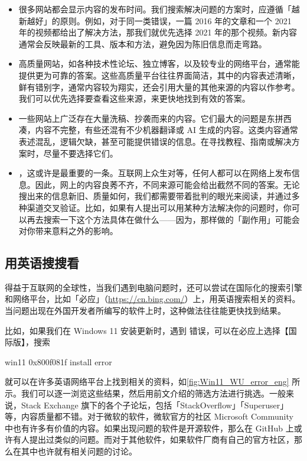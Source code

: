 \begin{itemize}
  \item {}很多网站都会显示内容的发布时间。我们搜索解决问题的方案时，应遵循「越新越好」的原则。例如，对于同一类错误，一篇 2016 年的文章和一个 2021 年的视频都给出了解决方法，那我们就优先选择 2021 年的那个视频。新内容通常会反映最新的工具、版本和方法，避免因为陈旧信息而走弯路。
  \item {}高质量网站，如各种技术性论坛、独立博客，以及较专业的网络平台，通常能提供更为可靠的答案。这些高质量平台往往界面简洁，其中的内容表述清晰，鲜有错别字，通常内容较为翔实，还会引用大量的其他来源的内容以作参考。我们可以优先选择要查看这些来源，来更快地找到有效的答案。
  \item {}一些网站上广泛存在大量洗稿、抄袭而来的内容。它们最大的问题是东拼西凑，内容不完整，有些还混有不少机器翻译或 AI 生成的内容。这类内容通常表述混乱，逻辑欠缺，甚至可能提供错误的信息。在寻找教程、指南或解决方案时，尽量不要选择它们。
  \item {}，这或许是最重要的一条。互联网上众生对等，任何人都可以在网络上发布信息。因此，网上的内容良莠不齐，不同来源可能会给出截然不同的答案。无论搜出来的信息新旧、质量如何，我们都需要带着批判的眼光来阅读，并通过多种渠道交叉验证。比如，如果有人提出可以用某种方法解决你的问题时，你可以再去搜索一下这个方法具体在做什么——因为，那样做的「副作用」可能会对你带来意料之外的影响。
\end{itemize}

\subsection{用英语搜搜看}

得益于互联网的全球性，当我们遇到电脑问题时，还可以尝试在国际化的搜索引擎和网络平台，比如「必应」（\url{https://cn.bing.com/}）上，用英语搜索相关的资料。当问题出现在外国开发者所编写的软件上时，这种做法往往能更快找到结果。

比如，如果我们在 Windows 11 安装更新时，遇到  错误，可以在必应上选择【国际版】，搜索

\begin{quoting}
  win11 0x800f081f install error
\end{quoting}

就可以在许多英语网络平台上找到相关的资料，如\autoref{fig:Win11_WU_error_eng} 所示。我们可以逐一浏览这些结果，然后用前文介绍的筛选方法进行挑选。一般来说，Stack Exchange 旗下的各个子论坛，包括「StackOverflow」「Superuser」等，内容质量都不错。对于微软的软件，微软官方的社区 Microsoft Community 中也有许多有价值的内容。如果出现问题的软件是开源软件，那么在 GitHub 上或许有人提出过类似的问题。而对于其他软件，如果软件厂商有自己的官方社区，那么在其中也许就有相关问题的讨论。

